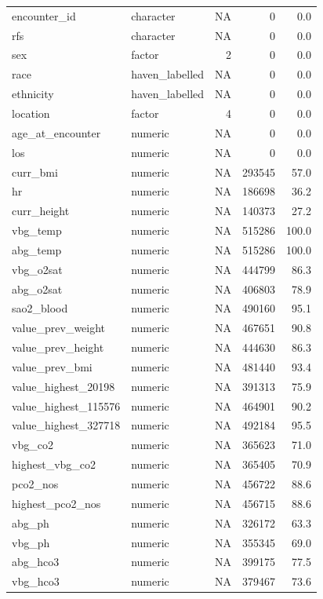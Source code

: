 \documentclass[
  11pt,
  letterpaper,
  DIV=11,
  numbers=noendperiod]{scrartcl}
\begin{document}
\begin{longtable*}{llrrr}
\endfoot
\bottomrule
\endlastfoot
encounter\_id & character & NA & 0 & 0.0\\
rfs & character & NA & 0 & 0.0\\
sex & factor & 2 & 0 & 0.0\\
race & haven\_labelled & NA & 0 & 0.0\\
ethnicity & haven\_labelled & NA & 0 & 0.0\\
\addlinespace
location & factor & 4 & 0 & 0.0\\
age\_at\_encounter & numeric & NA & 0 & 0.0\\
los & numeric & NA & 0 & 0.0\\
curr\_bmi & numeric & NA & 293545 & 57.0\\
hr & numeric & NA & 186698 & 36.2\\
\addlinespace
curr\_height & numeric & NA & 140373 & 27.2\\
vbg\_temp & numeric & NA & 515286 & 100.0\\
abg\_temp & numeric & NA & 515286 & 100.0\\
vbg\_o2sat & numeric & NA & 444799 & 86.3\\
abg\_o2sat & numeric & NA & 406803 & 78.9\\
\addlinespace
sao2\_blood & numeric & NA & 490160 & 95.1\\
value\_prev\_weight & numeric & NA & 467651 & 90.8\\
value\_prev\_height & numeric & NA & 444630 & 86.3\\
value\_prev\_bmi & numeric & NA & 481440 & 93.4\\
value\_highest\_20198 & numeric & NA & 391313 & 75.9\\
\addlinespace
value\_highest\_115576 & numeric & NA & 464901 & 90.2\\
value\_highest\_327718 & numeric & NA & 492184 & 95.5\\
vbg\_co2 & numeric & NA & 365623 & 71.0\\
highest\_vbg\_co2 & numeric & NA & 365405 & 70.9\\
pco2\_nos & numeric & NA & 456722 & 88.6\\
\addlinespace
highest\_pco2\_nos & numeric & NA & 456715 & 88.6\\
abg\_ph & numeric & NA & 326172 & 63.3\\
vbg\_ph & numeric & NA & 355345 & 69.0\\
abg\_hco3 & numeric & NA & 399175 & 77.5\\
vbg\_hco3 & numeric & NA & 379467 & 73.6\\

\end{longtable*}
\end{document}
